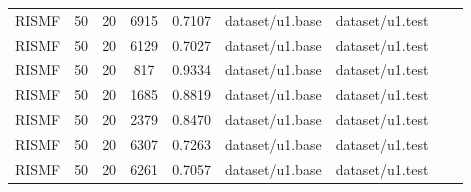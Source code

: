 \documentclass[11pt]{amsart}
\begin{document}
\begin{table}[ht]
\begin{tabular}{ccccccccc}
    RISMF & 50 & 20 & 6915 & 0.7107 & dataset/u1.base & dataset/u1.test\\
    RISMF & 50 & 20 & 6129 & 0.7027 & dataset/u1.base & dataset/u1.test\\
    RISMF & 50 & 20 & 817 &  0.9334 & dataset/u1.base & dataset/u1.test \\
    RISMF & 50 & 20 & 1685 & 0.8819 & dataset/u1.base & dataset/u1.test\\
    RISMF & 50 & 20 & 2379 & 0.8470 & dataset/u1.base & dataset/u1.test\\
    RISMF & 50 & 20 & 6307 & 0.7263 & dataset/u1.base & dataset/u1.test\\
    RISMF & 50 & 20 & 6261 & 0.7057 & dataset/u1.base & dataset/u1.test\\  \bottomrule
    \end{tabular}
    \label{tag:final_results}
  \end{table}

\newpage



\end{document}
